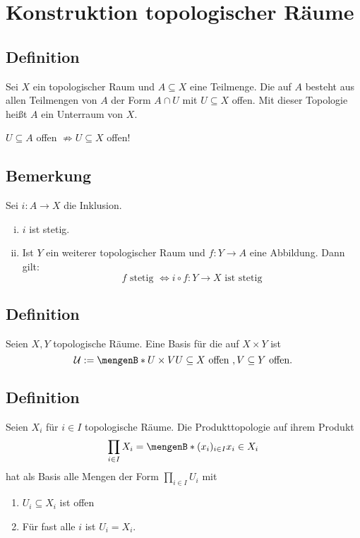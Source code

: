 \section{Konstruktion topologischer Räume} %
\label{sec:2}

\subsection[Definition: Spurtopologie]{Definition} %
\label{sub:21}
Sei $X$ ein topologischer Raum und $A \subseteq X$ eine Teilmenge. Die  auf $A$ besteht aus allen Teilmengen von $A$ der Form $A \cap U$ mit 
$U \subseteq X$ offen. Mit dieser Topologie heißt $A$ ein Unterraum von $X$.

 $U \subseteq A$ offen $\not\Rightarrow 	U \subseteq X$ offen!

\subsection[Bemerkung: Stetigkeit durch Verknüpfung mit Inklusion]{Bemerkung} %
\label{sub:22}
Sei $i : A \to X$ die Inklusion.
\begin{enumerate}[(i)]
	\item $i$ ist stetig.
	\item Ist $Y$ ein weiterer topologischer Raum und $f : Y \to A$ eine Abbildung. Dann gilt:
	\[
		f \text{ stetig } \iff i \circ  f : Y \to X \text{ ist stetig}
	\]
\end{enumerate}

\subsection[Definition: Produkttopologie]{Definition} %
\label{sub:23}
Seien $X,Y$ topologische Räume. Eine Basis für die  auf $X \times Y$ ist 
\[
	\mathcal{U} := \set[U \times V]{U \subseteq X \text{ offen }, V \subseteq Y \text{ offen}}. 
\]

\subsection[Definition: Produkttopologie mit unendlichen vielen Faktoren]{Definition} %
\label{sub:24}
Seien $X_i$ für $i \in I$ topologische Räume. Die Produkttopologie auf ihrem Produkt 
\[
	\prod_{i \in I} X_i = \set[(x_i)_{i \in I}]{x_i \in X_i} 
\]
hat als Basis alle Mengen der Form $\prod_{i \in I} U_i$ mit
\begin{enumerate}[1)]
	\item $U_i \subseteq X_i$ ist offen
	\item Für fast alle $i$ ist $U_i = X_i$.
\end{enumerate}

